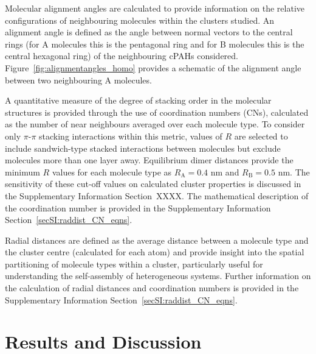 Molecular alignment angles are calculated to provide information on the relative configurations of neighbouring molecules within the clusters studied. An alignment angle is defined as the angle between normal vectors to the central rings (for A molecules this is the pentagonal ring and for B molecules this is the central hexagonal ring) of the neighbouring cPAHs considered.  Figure~\ref{fig:alignmentangles_homo} provides a schematic of the alignment angle between two neighbouring A molecules.

A quantitative measure of the degree of stacking order in the molecular structures is provided through the use of coordination numbers (CNs), calculated as the number of near neighbours averaged over each molecule type. To consider only $\pi$-$\pi$ stacking interactions within this metric, values of $R$ are selected to include sandwich-type stacked interactions between molecules but exclude molecules more than one layer away. Equilibrium dimer distances provide the minimum $R$ values for each molecule type as $R_{\text{A}} = 0.4$ nm and $R_{\text{B}} = 0.5$ nm. The sensitivity of these cut-off values on calculated cluster properties is discussed in the Supplementary Information Section~XXXX. The mathematical description of the coordination number is provided in the Supplementary Information Section~\ref{secSI:raddist_CN_eqns}.

Radial distances are defined as the average distance between a molecule type and the cluster centre (calculated for each atom) and provide insight into the spatial partitioning of molecule types within a cluster, particularly useful for understanding the self-assembly of heterogeneous systems. Further information on the calculation of radial distances and coordination numbers is provided in the Supplementary Information Section~\ref{secSI:raddist_CN_eqns}.



\section{Results and Discussion}
%
